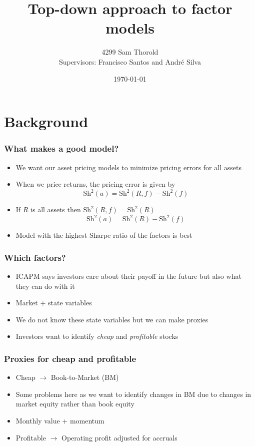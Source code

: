 \documentclass{beamer}
\title[Asset-Pricing]{Top-down approach to factor models}
\author[Thorold]{4299 Sam Thorold\\
                 Supervisors: Francisco Santos and Andr\'e Silva}
\institute{NHH and NOVA}
\date[April 2018]{\today}
\begin{document}
\frame{\titlepage}


\section{Background}

\begin{frame}
\frametitle{What makes a good model?}
\begin{itemize}
    \item<1-> We want our asset pricing models to minimize pricing errors for
    all assets
    \item<1-> When we price returns, the pricing error is given by
    \[
    \text{Sh}^2(a) = \text{Sh}^2(R, f) - \text{Sh}^2(f)
    \]
    \item<2-> If $R$ is all assets then $\text{Sh}^2(R, f) = \text{Sh}^2(R)$
    \[
    \text{Sh}^2(a) = \text{Sh}^2(R) - \text{Sh}^2(f)
    \]
    \item<2->Model with the highest Sharpe ratio of the factors is best
\end{itemize}
\end{frame}

\begin{frame}
\frametitle{Which factors?}
\begin{itemize}
    \item<1-> ICAPM says investors care about their payoff in the future but
    also what they can do with it
    \item<1-> Market + state variables
    \item<1-> We do not know these state variables but we can make proxies
    \item<2-> Investors want to identify \emph{cheap} and \emph{profitable} stocks
\end{itemize}
\end{frame}

\begin{frame}
\frametitle{Proxies for cheap and profitable}
\begin{itemize}
    \item<1-> Cheap $\rightarrow$ Book-to-Market (BM)
    \item<1-> Some problems here as we want to identify changes in BM due to
    changes in market equity rather than book equity
    \item<1-> Monthly value + momentum
    \item<2-> Profitable $\rightarrow$ Operating profit adjusted for accruals
\end{itemize}
\end{frame}
\end{document}
